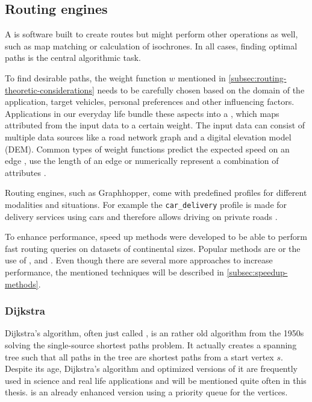 	\subsection{Routing engines}
		
		A  is software built to create routes but might perform other operations as well, such as map matching or calculation of isochrones.
		In all cases, finding optimal paths is the central algorithmic task.
		
		To find desirable paths, the weight function $w$ mentioned in \cref{subsec:routing-theoretic-considerations} needs to be carefully chosen based on the domain of the application, target vehicles, personal preferences and other influencing factors.
		Applications in our everyday life bundle these aspects into a , which maps attributed from the input data to a certain weight.
		The input data can consist of multiple data sources like a road network graph and a digital elevation model (DEM).
		Common types of weight functions predict the expected speed on an edge \cite{graphhopper-profile-bike-speeds}, use the length of an edge \cite{graphhopper-profile-shortest} or numerically represent a combination of attributes \cite{graphhopper-profile-short-fastest}.
		
		Routing engines, such as Graphhopper, come with predefined profiles for different modalities and situations.
		For example the \texttt{car\_delivery} profile is made for delivery services using cars and therefore allows driving on private roads \cite{graphhopper-routing-profiles}.
		
		To enhance performance, speed up methods were developed to be able to perform fast routing queries on datasets of continental sizes.
		Popular methods are  or the use of ,  and .
		Even though there are several more approaches to increase performance, the mentioned techniques will be described in \cref{subsec:speedup-methods}.
		
		\subsubsection{Dijkstra}
		\label{subsubsec:dijkstra}
		
			Dijkstra's algorithm, often just called , is an rather old algorithm from the 1950s solving the single-source shortest paths problem.
			It actually creates a spanning tree such that all paths in the tree are shortest paths from a start vertex $s$.
			Despite its age, Dijkstra's algorithm and optimized versions of it are frequently used in science and real life applications and will be mentioned quite often in this thesis.
			 is an already enhanced version using a priority queue for the vertices\cite[658]{cormen-introduction-to-alg}.
			
